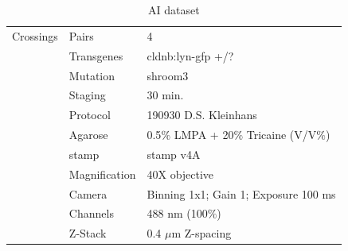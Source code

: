 \documentclass[11pt,singlespacinge,twoside]{reedthesis} %
\begin{document}
\begin{table}[!h]

\caption{\label{tab:imgdatai}AI dataset}
\centering
\begin{tabu} to 
\toprule
{}  Crossings & Pairs & 4\\
 & Transgenes & cldnb:lyn-gfp +/?\\

   & Mutation & shroom3\\

 & Staging & 30 min.\\

   & Protocol & 190930 D.S. Kleinhans\\

 & Agarose & 0.5$\%$ LMPA + 20$\%$ Tricaine (V/V$\%$)\\

   & stamp & stamp v4A\\

 & Magnification & 40X objective\\

   & Camera & Binning 1x1; Gain 1; Exposure 100 ms\\

 & Channels & 488 nm (100$\%$)\\

   & Z-Stack & 0.4 $\mu$m Z-spacing\\
\bottomrule
\end{tabu}
\end{table}
\end{document}
